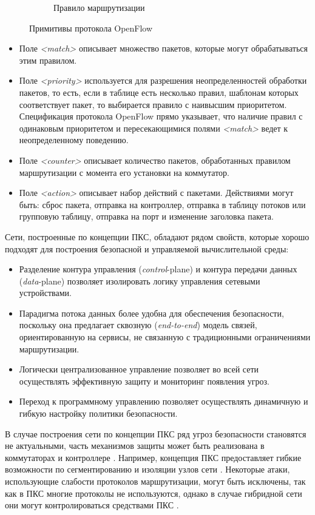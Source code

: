 \documentclass[../thesis.tex]{subfiles}
\begin{document}
\begin{figure}
\begin{subfigure}[b]{0.4\textwidth}
  \caption{Правило маршрутизации} \label{fig:flowrule}
\end{subfigure}
\caption{Примитивы протокола OpenFlow}
\end{figure}

\begin{itemize}
\item Поле \textit{<match>} описывает множество пакетов, которые могут обрабатываться этим правилом.
\item Поле \textit{<priority>} используется для разрешения неопределенностей обработки пакетов, то есть, если в таблице есть несколько правил, шаблонам которых соответствует пакет, то выбирается правило с наивысшим приоритетом.
Спецификация протокола OpenFlow прямо указывает, что наличие правил с одинаковым приоритетом и пересекающимися полями \textit{<match>} ведет к неопределенному поведению.
\item Поле \textit{<counter>} описывает количество пакетов, обработанных правилом маршрутизации с момента его установки на коммутатор.
\item Поле \textit{<action>} описывает набор действий с пакетами.
Действиями могут быть: сброс пакета, отправка на контроллер, отправка в таблицу потоков или групповую таблицу, отправка на порт и изменение заголовка пакета.
\end{itemize}

Сети, построенные по концепции ПКС, обладают рядом свойств, которые хорошо подходят для построения безопасной и управляемой вычислительной среды:
\begin{itemize}
\item Разделение контура управления (\textit{control}-plane) и контура передачи данных (\textit{data}-plane) позволяет изолировать логику управления сетевыми устройствами.
\item Парадигма потока данных более удобна для обеспечения безопасности, поскольку она предлагает сквозную (\textit{end-to-end}) модель связей, ориентированную на сервисы, не связанную с традиционными ограничениями маршрутизации.
\item Логически централизованное управление позволяет во всей сети осуществлять эффективную защиту и мониторинг появления угроз.
\item Переход к программному управлению позволяет осуществлять динамичную и гибкую настройку политики безопасности.
\end{itemize}

В случае построения сети по концепции ПКС ряд угроз безопасности становятся не актуальными, часть механизмов защиты может быть реализована в коммутаторах и контроллере \cite{chao2016securing}.
Например, концепция ПКС предоставляет гибкие возможности по сегментированию и изоляции узлов сети \cite{kreutz2015software}.
Некоторые атаки, использующие слабости протоколов маршрутизации, могут быть исключены, так как в ПКС многие протоколы не используются, однако в случае гибридной сети они могут контролироваться средствами ПКС \cite{scott2013sdn}.
\end{document}
